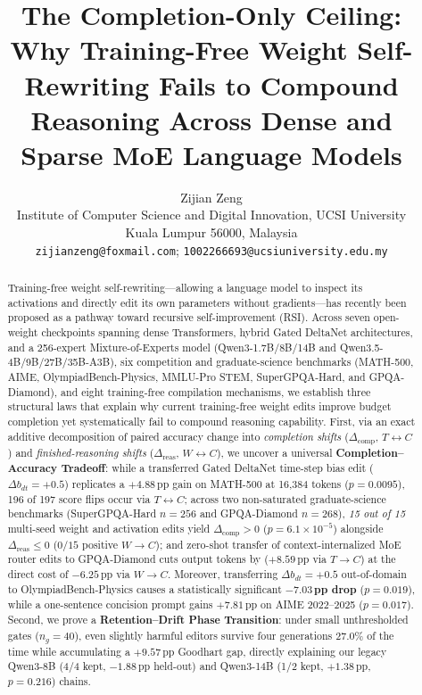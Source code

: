 \documentclass[10pt]{article}
\title{\textbf{The Completion-Only Ceiling: Why Training-Free Weight Self-Rewriting Fails to Compound Reasoning Across Dense and Sparse MoE Language Models}}
\author{Zijian Zeng\\[3pt]
{\normalsize Institute of Computer Science and Digital Innovation, UCSI University}\\
{\normalsize Kuala Lumpur 56000, Malaysia}\\[2pt]
{\normalsize \texttt{zijianzeng@foxmail.com}; \texttt{1002266693@ucsiuniversity.edu.my}}}
\date{}
\begin{document}
\maketitle

\begin{abstract}
Training-free weight self-rewriting---allowing a language model to inspect its activations and directly edit its own parameters without gradients---has recently been proposed as a pathway toward recursive self-improvement (RSI). Across seven open-weight checkpoints spanning dense Transformers, hybrid Gated DeltaNet architectures, and a 256-expert Mixture-of-Experts model (Qwen3-1.7B/8B/14B and Qwen3.5-4B/9B/27B/35B-A3B), six competition and graduate-science benchmarks (MATH-500, AIME, OlympiadBench-Physics, MMLU-Pro STEM, SuperGPQA-Hard, and GPQA-Diamond), and eight training-free compilation mechanisms, we establish three structural laws that explain why current training-free weight edits improve budget completion yet systematically fail to compound reasoning capability.
First, via an exact additive decomposition of paired accuracy change into \emph{completion shifts} ($\Delta_{\mathrm{comp}}$, $T\!\leftrightarrow\!C$) and \emph{finished-reasoning shifts} ($\Delta_{\mathrm{reas}}$, $W\!\leftrightarrow\!C$), we uncover a universal \textbf{Completion--Accuracy Tradeoff}: while a transferred Gated DeltaNet time-step bias edit ($\Delta b_{dt}=+0.5$) replicates a $+4.88$\,pp gain on MATH-500 at 16,384 tokens ($p=0.0095$), 196 of 197 score flips occur via $T\!\leftrightarrow\!C$; across two non-saturated graduate-science benchmarks (SuperGPQA-Hard $n=256$ and GPQA-Diamond $n=268$), \emph{15 out of 15} multi-seed weight and activation edits yield $\Delta_{\mathrm{comp}}>0$ ($p=6.1\times 10^{-5}$) alongside $\Delta_{\mathrm{reas}}\le 0$ ($0/15$ positive $W\!\to\!C$); and zero-shot transfer of context-internalized MoE router edits to GPQA-Diamond cuts output tokens by \GPQATokCut{} ($+8.59$\,pp via $T\!\to\!C$) at the direct cost of $-6.25$\,pp via $W\!\to\!C$. Moreover, transferring $\Delta b_{dt}=+0.5$ out-of-domain to OlympiadBench-Physics causes a statistically significant \textbf{$-7.03$\,pp drop} ($p=0.019$), while a one-sentence concision prompt gains $+7.81$\,pp on AIME 2022--2025 ($p=0.017$).
Second, we prove a \textbf{Retention--Drift Phase Transition}: under small unthresholded gates ($n_g=40$), even slightly harmful editors survive four generations 27.0\% of the time while accumulating a $+9.57$\,pp Goodhart gap, directly explaining our legacy Qwen3-8B (4/4 kept, $-1.88$\,pp held-out) and Qwen3-14B (1/2 kept, $+1.38$\,pp, $p=0.216$) chains.

\end{abstract}
\end{document}
